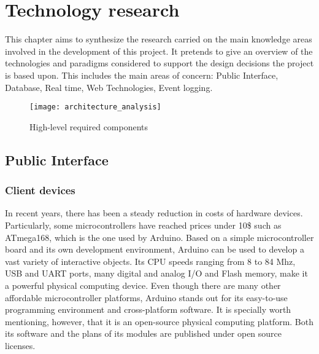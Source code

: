 \chapter{Technology research}

This chapter aims to synthesize the research carried on the main knowledge areas involved in the development of this project. It pretends to give an overview of the technologies and paradigms considered to support the design decisions the project is based upon. This includes the main areas of concern: Public Interface, Database, Real time, Web Technologies, Event logging.

\begin{figure}[h]
	\centering
	\texttt{[image: architecture\_analysis]}
	\caption{High-level required components}
	\label{fig:arch_analysis}
\end{figure}

\section{Public Interface}

\subsection{Client devices}

In recent years, there has been a steady reduction in costs of hardware devices. Particularly, some microcontrollers have reached prices under 10\$ such as ATmega168, which is the one used by Arduino. Based on a simple microcontroller board and its own development environment, Arduino can be used to develop a vast variety of interactive objects. Its CPU speeds ranging from 8 to 84 Mhz, USB and UART ports, many digital and analog I/O and Flash memory, make it a powerful physical computing device. Even though there are many other affordable microcontroller platforms, Arduino stands out for its easy-to-use programming environment and cross-platform software. It is specially worth mentioning, however, that it is an open-source physical computing platform. Both its software and the plans of its modules are published under open source licenses.

